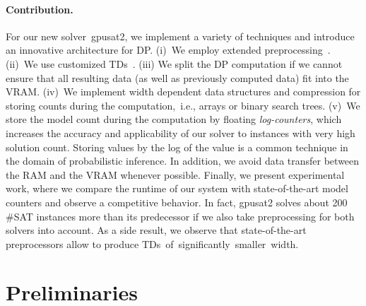 \documentclass{llncs}
\newcommand{\gpusatnu}{{\small\textsf{gpusat2}}\xspace}
\begin{document}
\paragraph{Contribution.}  For our new solver~\gpusatnu, we implement
a variety of techniques and introduce an innovative architecture for
DP.
%
(i)~We employ extended
preprocessing~\cite{LagniezLoncaMarquis16a,LagniezMarquis14a}.
(ii)~We use customized TDs~\cite{AbseherMusliuWoltran17a}. (iii) We
split the DP computation if we cannot ensure that all resulting data
(as well as previously computed data) fit into the VRAM.
%
(iv)~We implement width dependent data structures and compression for
storing counts during the computation,~i.e., arrays or binary search
trees.
%
(v)~We store the model count during the computation by floating
\emph{log-counters}, which increases the accuracy and applicability of
our solver to instances with very high solution count. Storing values
by the log of the value is a common technique in the domain of
probabilistic inference.
%
In addition, we avoid data transfer between the RAM and the VRAM
whenever possible.
%
%
Finally, we present experimental work, where we compare the runtime of
our system with state-of-the-art model counters and observe a
competitive behavior. In fact, \gpusatnu solves about 200 \#SAT
instances more than its predecessor if we also take
preprocessing for both solvers into account.
%
As a side result, we observe that state-of-the-art preprocessors allow
to produce TDs~of~significantly~smaller~width.





\section{Preliminaries}

\label{fig:prim1}%
\end{document}
